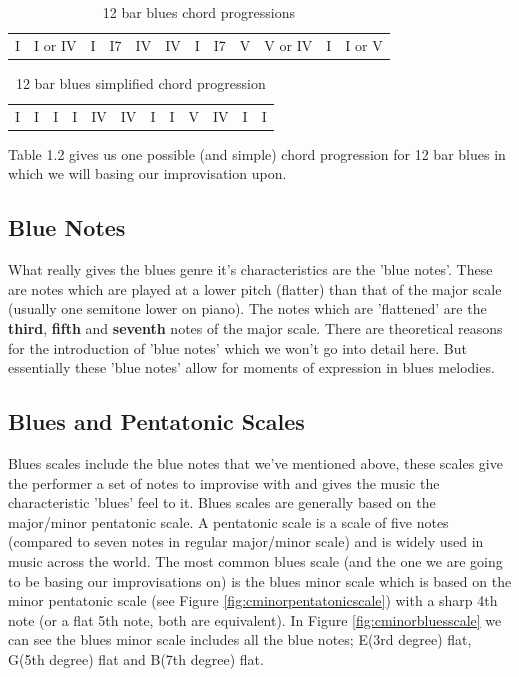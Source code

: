 \documentclass[pdftex,12pt,a4paper]{report}
\begin{document}
\begin{table}[here]
\centering
{}
\begin{tabular}{|*{12}{C|}}
  I & I or IV & I & I7 & IV & IV & I & I7 & V & V or IV & I & I or V
\end{tabular}
\caption{12 bar blues chord progressions}
\label{12 bar blues}
\end{table}


\begin{table}[here]
\centering
{}
\begin{tabular}{|*{12}{C|}}
  I & I & I & I & IV & IV & I & I & V & IV & I & I
\end{tabular}
\caption{12 bar blues simplified chord progression}
\label{12 bar blues}
\end{table}

Table 1.2 gives us one possible (and simple) chord progression for 12 bar blues in which we will basing our improvisation upon. 

\subsection{Blue Notes} What really gives the blues genre it's characteristics are the 'blue notes'. These are notes which are played at a lower pitch (flatter) than that of the major scale (usually one semitone lower on piano). The notes which are 'flattened' are the \textbf{third}, \textbf{fifth} and \textbf{seventh} notes of the major scale.
There are theoretical reasons for the introduction of 'blue notes' which we won't go into detail here. But essentially these 'blue notes' allow for moments of expression in blues melodies. 

\subsection{Blues and Pentatonic Scales}
Blues scales include the blue notes that we've mentioned above, these scales give the performer a set of notes to improvise with and gives the music the characteristic 'blues' feel to it. Blues scales are generally based on the major/minor pentatonic scale. A pentatonic scale is a scale of five notes (compared to seven notes in regular major/minor scale) and is widely used in music across the world. The most common blues scale (and the one we are going to be basing our improvisations on) is the blues minor scale which is based on the minor pentatonic scale (see Figure \ref{fig:cminorpentatonicscale}) with a sharp 4th note (or a flat 5th note, both are equivalent). In Figure \ref{fig:cminorbluesscale} we can see the blues minor scale includes all the blue notes; E(3rd degree) flat, G(5th degree) flat and B(7th degree) flat.
\end{document}

